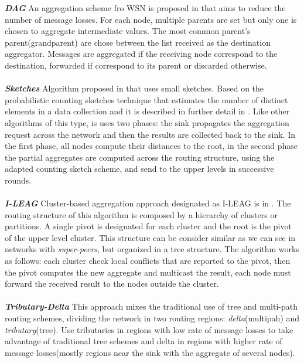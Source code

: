 \textbf{\textit{DAG}} An aggregation scheme fro WSN is proposed in \cite{motegi2006dag} that aims to reduce the number of message losses. For each node, multiple parents are set but only one is chosen to aggregate intermediate values. The most common parent's parent(grandparent) are chose between the list received as the destination aggregator. Messages are aggregated if the receiving node correspond to the destination, forwarded if correspond to its parent or discarded otherwise.\\
\\

\textbf{\textit{Sketches}} Algorithm proposed in \cite{considine2004approximate} that uses small sketches. Based on the probabilistic counting sketches technique that estimates the number of distinct elements in a data collection and it is described in further detail in \cite{fan2008efficient}. Like other algorithms of this type, is uses two phases: the sink propagates the aggregation request across the network and then the results are collected back to the sink. In the first phase, all nodes compute their distances to the root, in the second phase the partial aggregates are computed across the routing structure, using the adapted counting sketch scheme, and send to the upper levels in successive rounds.\\
\\
\textbf{\textit{I-LEAG}} Cluster-based aggregation approach designated as I-LEAG is in \cite{birk2006veracity}. The routing structure of this algorithm is composed by a hierarchy of clusters or partitions. A single pivot is designated for each cluster and the root is the pivot of the upper level cluster. This structure can be consider similar as we can see in networks with \textit{super-peers}, but organized in a tree structure. The algorithm works as follows: each cluster check local conflicts that are reported to the pivot, then the pivot computes the new aggregate and multicast the result, each node must forward the received result to the nodes outside the cluster.\\
\\
\textbf{\textit{Tributary-Delta}} 
This approach mixes the traditional use of tree and multi-path routing schemes, dividing the network in two routing regions: \textit{delta}(multipah) and \textit{tributary}(tree). Use tributaries in regions with low rate of message losses to take advantage of traditional tree schemes and delta in regions with higher rate of message losses(mostly regions near the sink with the aggregate of several nodes).

